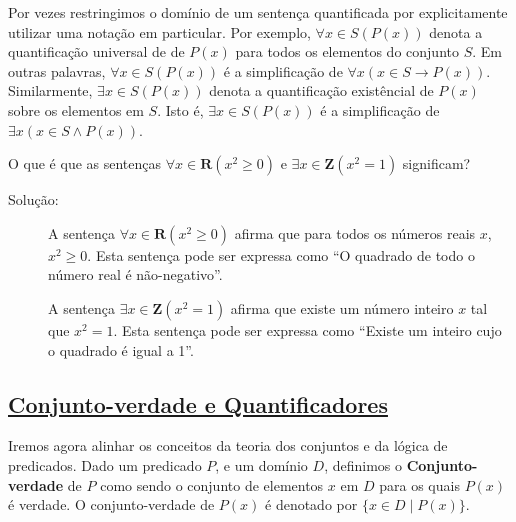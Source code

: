 Por vezes restringimos o domínio de um sentença quantificada por explicitamente
utilizar uma notação em particular. Por exemplo, $\forall x\in S(P(x))$ denota a
quantificação universal de de $P(x)$ para todos os elementos do conjunto $S$. Em
outras palavras, $\forall x\in S(P(x))$ é a simplificação de $\forall x (x \in
S \to P(x))$. Similarmente, $\exists x\in S(P(x))$ denota a quantificação
existêncial de $P(x)$ sobre os elementos em $S$. Isto é, $\exists x\in S(P(x))$
é a simplificação de $\exists x(x \in S \land P(x))$.

\begin{exmp}
\label{exem317}
O que é que as sentenças $\forall x\in \textbf{R}(x^2 \geq 0)$ e $\exists x \in
\textbf{Z}(x^2 = 1)$ significam?
\begin{description}
\item[Solução:] A sentença $\forall x\in \textbf{R}(x^2 \geq 0)$ afirma que para
todos os números reais $x$, $x^2 \geq 0$. Esta sentença pode ser expressa como
``O quadrado de todo o número real é não-negativo''.

A sentença $\exists x \in \textbf{Z}(x^2 = 1)$ afirma que existe um número
inteiro $x$ tal que $x^2 = 1$. Esta sentença
pode ser expressa como ``Existe um inteiro cujo o quadrado é igual a 1''.
\end{description}
\end{exmp}

\subsection*{\underline{Conjunto-verdade e Quantificadores}}

Iremos agora alinhar os conceitos da teoria dos conjuntos e da lógica de
predicados. Dado um predicado $P$, e um domínio $D$, definimos o
\textbf{Conjunto-verdade} de $P$ como sendo o conjunto de elementos $x$ em $D$
para os quais $P(x)$ é verdade. O conjunto-verdade de $P(x)$ é denotado por
$\{x \in D \mid P(x)\}$.

